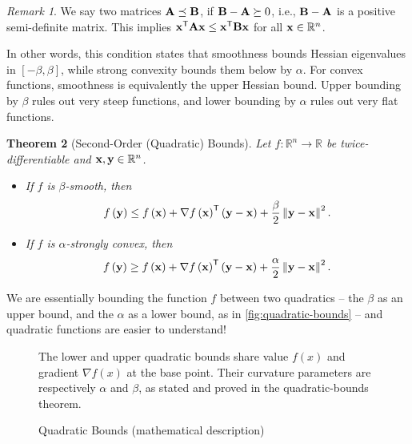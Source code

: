 \documentclass[11pt]{article}
\newtheorem{theorem}{Theorem}[section]
\theoremstyle{definition}
\theoremstyle{remark}
\newtheorem{remark}[theorem]{Remark}
\newcommand{\pqty}[1]{\left(#1\right)}
\newcommand{\functiondomain}[3]{#1:#2\to #3}
\newcommand{\RR}{\mathbb{R}}
\newcommand{\transpose}{^{\mathsf{T}}}
\newcommand{\grad}{\nabla}
\newcommand{\posDefEq}{\succeq}
\newcommand{\negDefEq}{\preceq}
\begin{document}
\begin{remark}\label{optim-unit-0012}
    We say two matrices \(\vb{A} \negDefEq \vb{B}\), if \(\vb{B} - \vb{A} \posDefEq 0\), i.e., \(\vb{B} - \vb{A}\) is a positive semi-definite matrix. This implies \(\vb{x}\transpose \vb{A} \vb{x} \leq \vb{x} \transpose \vb{B} \vb{x}\) for all \(\vb{x} \in \RR^n\).
\end{remark}

In other words, this condition states that smoothness bounds Hessian eigenvalues in \([-\beta,\beta]\), while strong convexity bounds them below by \(\alpha\). For convex functions, smoothness is equivalently the upper Hessian bound. Upper bounding by \(\beta\) rules out very steep functions, and lower bounding by \(\alpha\) rules out very flat functions.

\begin{theorem}[Second-Order (Quadratic) Bounds]\label{optim-unit-0013}
    \label{thm:second-order-quadratic-bounds}%
    Let \(\functiondomain{f}{\RR^n}{\RR}\) be twice-differentiable and \(\vb{x}, \vb{y} \in \RR^n\).

    \begin{itemize}
        \item If \(f\) is \(\beta\)-smooth, then
        \[
            f\pqty{\vb{y}} \leq f\pqty{\vb{x}} + \grad f\pqty{\vb{x}}\transpose \pqty{\vb{y} - \vb{x}} + \frac{\beta}{2} \norm{\vb{y} - \vb{x}}^2.
        \]

        \item If \(f\) is \(\alpha\)-strongly convex, then
        \[
            f\pqty{\vb{y}} \geq f\pqty{\vb{x}} + \grad f\pqty{\vb{x}}\transpose \pqty{\vb{y} - \vb{x}} + \frac{\alpha}{2} \norm{\vb{y} - \vb{x}}^2.
        \]
    \end{itemize}
\end{theorem}

We are essentially bounding the function \(f\) between two quadratics -- the \(\beta\) as an upper bound, and the \(\alpha\) as a lower bound, as in \autoref{fig:quadratic-bounds} -- and quadratic functions are easier to understand!

\begin{figure}[ht!]\centering\begin{minipage}{0.94\linewidth}The lower and upper quadratic bounds share value \(f(x)\) and gradient \(\nabla f(x)\) at the base point. Their curvature parameters are respectively \(\alpha\) and \(\beta\), as stated and proved in the quadratic-bounds theorem.\end{minipage}\caption{Quadratic Bounds (mathematical description)}\label{fig:quadratic-bounds}\end{figure}
\end{document}
